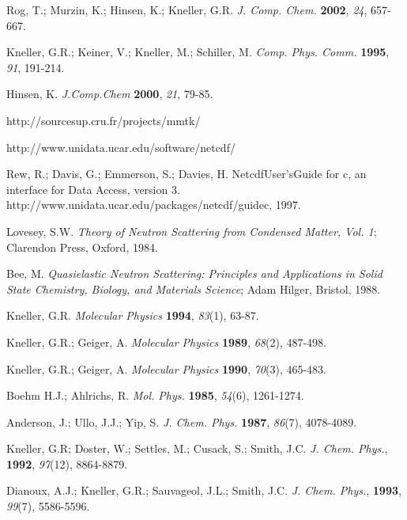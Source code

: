 \documentclass[a4paper,11pt]{report}
\begin{document}
\newpage
{}
{}
\begin{thebibliography}{99}

 Rog, T.; Murzin, K.; Hinsen, K.; Kneller, G.R. \textit{J. Comp. Chem.} \textbf{2002}, \textit{24}, 657-667.

 Kneller, G.R.; Keiner, V.; Kneller, M.; Schiller, M. \textit{Comp. Phys. Comm.} \textbf{1995}, \textit{91}, 191-214.

 Hinsen, K. \textit{J.Comp.Chem} \textbf{2000}, \textit{21}, 79-85.

 http://sourcesup.cru.fr/projects/mmtk/

 http://www.unidata.ucar.edu/software/netcdf/ 

 Rew, R.; Davis, G.; Emmerson, S.; Davies, H. NetcdfUser'sGuide for c, an interface for Data Access, version 3. http://www.unidata.ucar.edu/packages/netcdf/guidec, 1997. 

 Lovesey, S.W. \textit{Theory of Neutron Scattering from Condensed Matter, Vol. 1}; Clarendon Press, Oxford, 1984.

 Bee, M. \textit{Quasielastic Neutron Scattering: Principles and Applications in Solid State Chemistry, Biology, and Materials Science}; Adam Hilger, Bristol, 1988.

 Kneller, G.R. \textit{Molecular Physics} \textbf{1994}, \textit{83}(1), 63-87.

 Kneller, G.R.; Geiger, A. \textit{Molecular Physics} \textbf{1989}, \textit{68}(2), 487-498.

 Kneller, G.R.; Geiger, A. \textit{Molecular Physics} \textbf{1990}, \textit{70}(3), 465-483.

 Boehm H.J.; Ahlrichs, R. \textit{Mol. Phys.} \textbf{1985}, \textit{54}(6), 1261-1274.

 Anderson, J.; Ullo, J.J.; Yip, S. \textit{J. Chem. Phys.} \textbf{1987}, \textit{86}(7), 4078-4089.

 Kneller, G.R; Doster, W.; Settles, M.; Cusack, S.; Smith, J.C. \textit{J. Chem. Phys.}, \textbf{1992}, \textit{97}(12), 8864-8879.

 Dianoux, A.J.; Kneller, G.R.; Sauvageol, J.L.; Smith, J.C. \textit{J. Chem. Phys.}, \textbf{1993}, \textit{99}(7), 5586-5596.


\end{thebibliography}
\end{document}
